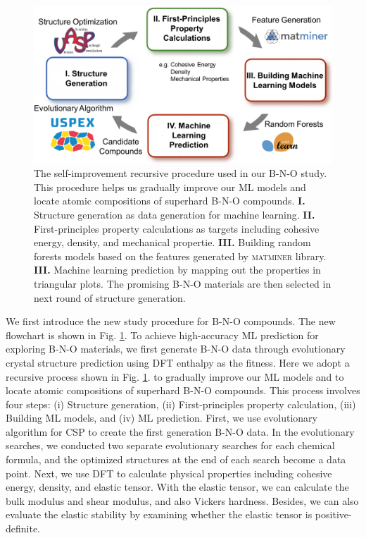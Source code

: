     
	\begin{figure}[htbp]
        \centering
        \captionsetup{singlelinecheck = false, justification=justified}
        \includegraphics[width=1.0\textwidth]{BNO_1_flowchart.png}
        \caption[The self-improvement recursive procedure used in our B-N-O study.]{The self-improvement recursive procedure used in our B-N-O study. This procedure helps us
        gradually improve our ML models and locate atomic compositions of superhard B-N-O compounds. {\bf I.} Structure generation as data generation for machine learning. {\bf II.} First-principles property calculations as targets including cohesive energy, density, and mechanical propertie. {\bf III.} Building random forests models based on the features generated by \textsc{matminer} library. {\bf III.} Machine learning prediction by mapping out the properties in triangular plots. The promising B-N-O materials are then selected in next round of structure generation.}
        \label{fig:BNO_flowchart}
    \end{figure}
    \pagebreak
    

    We first introduce the new study procedure for B-N-O compounds. The new flowchart is shown in Fig. \ref{fig:BNO_flowchart}.
	To achieve high-accuracy ML prediction for exploring B-N-O materials, we first generate B-N-O data through evolutionary crystal structure prediction using DFT enthalpy as the fitness. Here we adopt a recursive process shown in Fig. \ref{fig:BNO_flowchart}. to gradually improve our ML models and to locate atomic compositions of superhard B-N-O compounds. This process involves four steps: (i) Structure generation, (ii) First-principles property calculation, (iii) Building ML models, and (iv) ML prediction. First, we use evolutionary algorithm for CSP to create the first generation B-N-O data. In the evolutionary searches, we conducted two separate evolutionary searches for each chemical formula, and the optimized structures at the end of each search become a data point.
	Next, we use DFT to calculate physical properties including cohesive energy, density, and elastic tensor. With the elastic tensor, we can calculate the bulk modulus and shear modulus, and also Vickers hardness. Besides, we can also evaluate the elastic stability by examining whether the elastic tensor is positive-definite. 
	
